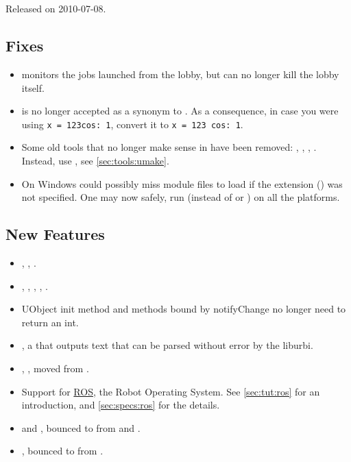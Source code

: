\section{}
Released on 2010-07-08.

\subsection{Fixes}
\begin{itemize}
\item {} monitors the jobs launched from the
  lobby, but can no longer kill the lobby itself.
\item {} is no longer accepted as a synonym to .
  As a consequence, in case you were using \lstinline|x = 123cos: 1|,
  convert it to \lstinline|x = 123 cos: 1|.
\item Some old tools that no longer make sense in  have been
  removed: , ,
  , .  Instead, use
  , see \autoref{sec:tools:umake}.
\item On Windows  could possibly miss module files to
  load if the extension () was not specified.  One may now
  safely, run  (instead of  or ) on all the platforms.
\end{itemize}

\subsection{New Features}
\begin{itemize}
\item {}, ,
  .
\item {}, ,
  , ,
  .
\item UObject init method and methods bound by notifyChange no longer need
  to return an int.
\item {}, a  that outputs text
  that can be parsed without error by the liburbi.
\item {}, , moved from
  .
\item Support for \href{http://www.ros.org}{ROS}, the Robot Operating
  System.  See \autoref{sec:tut:ros} for an introduction, and
  \autoref{sec:specs:ros} for the details.
\item {} and , bounced to from
   and .
\item {}, bounced to from .
\end{itemize}

